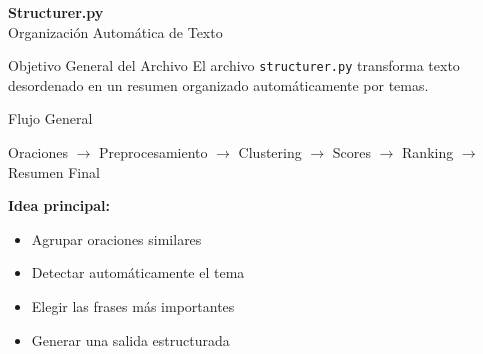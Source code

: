 
\begin{frame}
    \begin{center}
        {\Huge \textbf{Structurer.py}}\\[0.4em]
        {\Large Organización Automática de Texto}
    \end{center}
\end{frame}


\begin{frame}{Objetivo General del Archivo}
El archivo \texttt{structurer.py} transforma texto desordenado
en un resumen organizado automáticamente por temas.

\vspace{0.4em}

\begin{block}{Flujo General}
\begin{center}
Oraciones
$\rightarrow$
Preprocesamiento
$\rightarrow$
Clustering
$\rightarrow$
Scores
$\rightarrow$
Ranking
$\rightarrow$
Resumen Final
\end{center}
\end{block}

\vspace{0.4em}

\textbf{Idea principal:}
\begin{itemize}
    \item Agrupar oraciones similares
    \item Detectar automáticamente el tema
    \item Elegir las frases más importantes
    \item Generar una salida estructurada
\end{itemize}

\end{frame}


